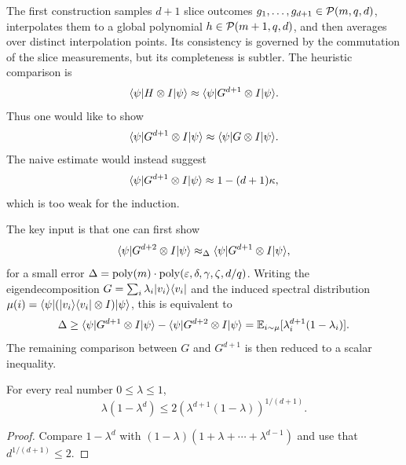 The first construction samples $d+1$ slice outcomes $g_1,\dots,g_{d+1}\in \mathcal{P}(m,q,d)$, interpolates them to a global polynomial $h \in \mathcal{P}(m+1,q,d)$, and then averages over distinct interpolation points. Its consistency is governed by the commutation of the slice measurements, but its completeness is subtler. The heuristic comparison is
\[
	\langle \psi \rvert H \otimes I \lvert \psi \rangle \approx \langle \psi \rvert G^{d+1} \otimes I \lvert \psi \rangle.
\]
Thus one would like to show
\begin{equation}\label{eq:first-construction-g-power-comparison}
	\langle \psi \rvert G^{d+1} \otimes I \lvert \psi \rangle
	\approx \langle \psi \rvert G \otimes I \lvert \psi \rangle.
\end{equation}
The naive estimate would instead suggest
\begin{equation}\label{eq:first-construction-naive-bound}
	\langle \psi \rvert G^{d+1} \otimes I \lvert \psi \rangle \approx 1-(d+1)\kappa,
\end{equation}
which is too weak for the induction.

The key input is that one can first show
\begin{equation}\label{eq:first-construction-power-increment}
	\langle \psi \rvert G^{d+2} \otimes I \lvert \psi \rangle
	\approx_\Delta \langle \psi \rvert G^{d+1} \otimes I \lvert \psi \rangle,
\end{equation}
for a small error $\Delta = \operatorname{poly}(m)\cdot \operatorname{poly}(\varepsilon,\delta,\gamma,\zeta,d/q)$. Writing the eigendecomposition $G=\sum_i \lambda_i \lvert v_i \rangle\langle v_i \rvert$ and the induced spectral distribution $\mu(i)=\langle \psi \rvert(\lvert v_i \rangle\langle v_i \rvert\otimes I)\lvert \psi \rangle$, this is equivalent to
\begin{equation}\label{eq:first-construction-spectral-defect}
	\Delta
	\ge \langle \psi \rvert G^{d+1} \otimes I \lvert \psi \rangle - \langle \psi \rvert G^{d+2} \otimes I \lvert \psi \rangle
	= \mathbb{E}_{i\sim\mu}[\lambda_i^{d+1}(1-\lambda_i)].
\end{equation}
The remaining comparison between $G$ and $G^{d+1}$ is then reduced to a scalar inequality.

\begin{lemma}\label{lem:looks-easy-but-took-me-a-while}
	\leanok
	For every real number $0 \le \lambda \le 1$,
	\[
		\lambda(1-\lambda^d) \le 2(\lambda^{d+1}(1-\lambda))^{1/(d+1)}.
	\]
\end{lemma}
\begin{proof}
	\leanok
	Compare $1-\lambda^d$ with $(1-\lambda)(1+\lambda+\cdots+\lambda^{d-1})$ and use that $d^{1/(d+1)} \le 2$.
\end{proof}

